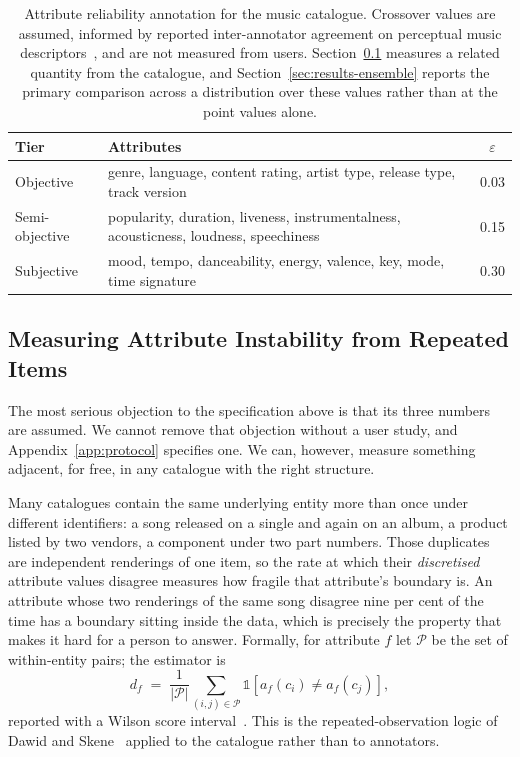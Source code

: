 \begin{table}[t]
\caption{Attribute reliability annotation for the music catalogue. Crossover
values are assumed, informed by reported inter-annotator agreement on
perceptual music descriptors~\cite{hu2007mood,kim2010emotion}, and are not
measured from users. Section~\ref{sec:reliability-empirical} measures a related
quantity from the catalogue, and Section~\ref{sec:results-ensemble} reports the
primary comparison across a distribution over these values rather than at the
point values alone.}
\label{tab:tiers}
\centering
\footnotesize
\begin{tabular}{@{}lp{}c@{}}
\toprule
\textbf{Tier} & \textbf{Attributes} & \textbf{$\varepsilon$} \\
\midrule
Objective & genre, language, content rating, artist type, release type, track version & 0.03 \\
Semi-objective & popularity, duration, liveness, instrumentalness, acousticness, loudness, speechiness & 0.15 \\
Subjective & mood, tempo, danceability, energy, valence, key, mode, time signature & 0.30 \\
\bottomrule
\end{tabular}
\end{table}

\subsection{Measuring Attribute Instability from Repeated Items}
\label{sec:reliability-empirical}

The most serious objection to the specification above is that its three numbers
are assumed. We cannot remove that objection without a user study, and
Appendix~\ref{app:protocol} specifies one. We can, however, measure something
adjacent, for free, in any catalogue with the right structure.

Many catalogues contain the same underlying entity more than once under
different identifiers: a song released on a single and again on an album, a
product listed by two vendors, a component under two part numbers. Those
duplicates are independent renderings of one item, so the rate at which their
\emph{discretised} attribute values disagree measures how fragile that
attribute's boundary is. An attribute whose two renderings of the same song
disagree nine per cent of the time has a boundary sitting inside the data,
which is precisely the property that makes it hard for a person to answer.
Formally, for attribute $f$ let $\mathcal{P}$ be the set of within-entity pairs;
the estimator is
\begin{equation}
d_f \;=\; \frac{1}{|\mathcal{P}|}\sum_{(i,j)\in\mathcal{P}}
          \mathbb{1}\!\left[a_f(c_i) \neq a_f(c_j)\right],
\label{eq:discordance}
\end{equation}
reported with a Wilson score interval~\cite{wilson1927}. This is the
repeated-observation logic of Dawid and Skene~\cite{dawid1979} applied to the
catalogue rather than to annotators.

